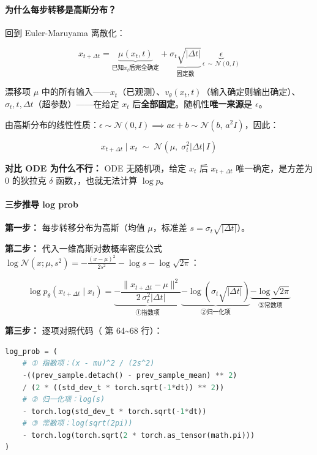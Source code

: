 \paragraph{为什么每步转移是高斯分布？}

回到 Euler-Maruyama 离散化：

\[
x_{t+\Delta t} = \underbrace{\mu(x_t,t)}_{\text{已知}x_t\text{后完全确定}} + \underbrace{\sigma_t\sqrt{|\Delta t|}}_{\text{固定数}}\,\underbrace{\epsilon}_{\epsilon\,\sim\,\mathcal{N}(0,I)}
\]

漂移项 $\mu$ 中的所有输入——$x_t$（已观测）、$v_\theta(x_t,t)$（输入确定则输出确定）、$\sigma_t,t,\Delta t$（超参数）——在给定 $x_t$ 后\textbf{全部固定}。随机性\textbf{唯一来源}是 $\epsilon$。

由高斯分布的线性性质：$\epsilon \sim \mathcal{N}(0,I) \implies a\epsilon+b \sim \mathcal{N}(b,\,a^2I)$，因此：

\[
x_{t+\Delta t} \mid x_t \;\sim\; \mathcal{N}\!\left(\mu,\; \sigma_t^2|\Delta t|\,I\right)
\]

\begin{warnbox}
\textbf{对比 ODE 为什么不行：} ODE 无随机项，给定 $x_t$ 后 $x_{t+\Delta t}$ 唯一确定，是方差为 0 的狄拉克 $\delta$ 函数，，也就无法计算 $\log p$。
\end{warnbox}

\paragraph{三步推导 log prob}

\textbf{第一步：} 每步转移分布为高斯（均值 $\mu$，标准差 $s = \sigma_t\sqrt{|\Delta t|}$）。

\textbf{第二步：} 代入一维高斯对数概率密度公式 $\log\mathcal{N}(x;\mu,s^2) = -\frac{(x-\mu)^2}{2s^2} - \log s - \log\sqrt{2\pi}$：

\[
\log p_\theta(x_{t+\Delta t} \mid x_t) = \underbrace{-\frac{\|x_{t+\Delta t}-\mu\|^2}{2\,\sigma_t^2|\Delta t|}}_{\text{①指数项}} \underbrace{-\log(\sigma_t\sqrt{|\Delta t|})}_{\text{②归一化项}} \underbrace{-\log\sqrt{2\pi}}_{\text{③常数项}}
\]

\textbf{第三步：} 逐项对照代码（ 第 64\textasciitilde68 行）：

\begin{lstlisting}[language=Python, caption=log\_prob 计算]
log_prob = (
    # ① 指数项：(x - mu)^2 / (2s^2)
    -((prev_sample.detach() - prev_sample_mean) ** 2)
    / (2 * ((std_dev_t * torch.sqrt(-1*dt)) ** 2))
    # ② 归一化项：log(s)
    - torch.log(std_dev_t * torch.sqrt(-1*dt))
    # ③ 常数项：log(sqrt(2pi))
    - torch.log(torch.sqrt(2 * torch.as_tensor(math.pi)))
)
\end{lstlisting}

